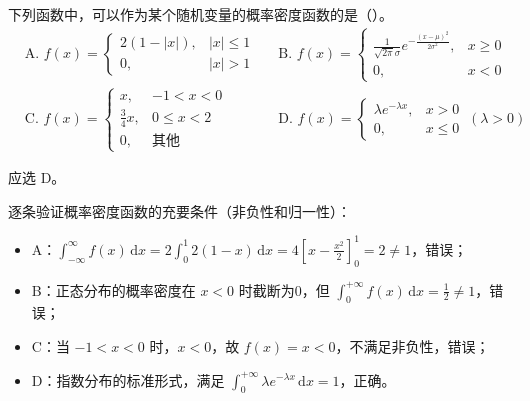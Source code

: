 ﻿\documentclass[lang=cn,11pt]{elegantbook}
\begin{document}
\begin{exercise}\label{exer:2-23}
下列函数中，可以作为某个随机变量的概率密度函数的是（\quad）。
\begin{align*}
&\text{A. } f(x) = \begin{cases} 2(1-|x|), & |x| \le 1 \\ 0, & |x|>1 \end{cases}
&&\text{B. } f(x) = \begin{cases} \frac{1}{\sqrt{2\pi}\sigma} e^{-\frac{(x-\mu)^2}{2\sigma^2}}, & x \ge 0 \\ 0, & x<0 \end{cases} \\
&\text{C. } f(x) = \begin{cases} x, & -1<x<0 \\ \frac{3}{4}x, & 0 \le x<2 \\ 0, & \text{其他} \end{cases}
&&\text{D. } f(x) = \begin{cases} \lambda e^{-\lambda x}, & x>0 \\ 0, & x \le 0 \end{cases} \ (\lambda>0)
\end{align*}
\end{exercise}

\begin{solution}
应选 D。

逐条验证概率密度函数的充要条件（非负性和归一性）：
\begin{itemize}
    \item A：$\displaystyle\int_{-\infty}^{\infty} f(x)\,\mathrm{d}x = 2\int_0^1 2(1-x)\,\mathrm{d}x = 4\left[x-\frac{x^2}{2}\right]_0^1 = 2 \neq 1$，错误；
    \item B：正态分布的概率密度在 $x<0$ 时截断为0，但 $\displaystyle\int_0^{+\infty} f(x)\,\mathrm{d}x = \frac{1}{2} \neq 1$，错误；
    \item C：当 $-1<x<0$ 时，$x<0$，故 $f(x)=x<0$，不满足非负性，错误；
    \item D：指数分布的标准形式，满足 $\displaystyle\int_0^{+\infty} \lambda e^{-\lambda x}\,\mathrm{d}x = 1$，正确。
\end{itemize}
\end{solution}
\end{document}
